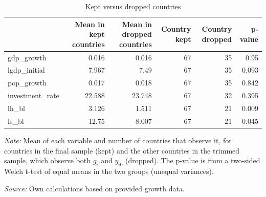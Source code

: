 \begin{table}[!htbp]
\centering
\caption{Kept versus dropped countries}
\label{tab:kept_vs_dropped}
\begin{threeparttable}
\begin{tabular}{lrrrrr}
\toprule
                 &   Mean in kept countries &   Mean in dropped countries &   Country kept &   Country dropped &   p-value \\
\midrule
 gdp\_growth      &                    0.016 &                       0.016 &             67 &                35 &     0.95  \\
 lgdp\_initial    &                    7.967 &                       7.49  &             67 &                35 &     0.093 \\
 pop\_growth      &                    0.017 &                       0.018 &             67 &                35 &     0.842 \\
 investment\_rate &                   22.588 &                      23.748 &             67 &                32 &     0.395 \\
 lh\_bl           &                    3.126 &                       1.511 &             67 &                21 &     0.009 \\
 ls\_bl           &                   12.75  &                       8.007 &             67 &                21 &     0.045 \\
\bottomrule
\end{tabular}
\begin{tablenotes}[flushleft]
\footnotesize
\item \textit{Note:} Mean of each variable and number of countries that observe it, for countries in the final sample (kept) and the other countries in the trimmed sample, which observe both $g_i$ and $y_{i0}$ (dropped). The p-value is from a two-sided Welch t-test of equal means in the two groups (unequal variances).
\item \textit{Source:} Own calculations based on provided growth data.
\end{tablenotes}
\end{threeparttable}
\end{table}